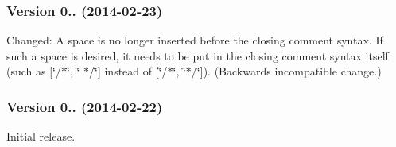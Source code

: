 \subsubsection*{Version 0.. (2014-\/02-\/23)}


\begin{DoxyItemize}
\item Changed\+: A space is no longer inserted before the closing comment syntax. If such a space is desired, it needs to be put in the closing comment syntax itself (such as {\ttfamily \mbox{[}\char`\"{}/$\ast$\char`\"{}, \char`\"{} $\ast$/\char`\"{}\mbox{]}} instead of {\ttfamily \mbox{[}\char`\"{}/$\ast$\char`\"{}, \char`\"{}$\ast$/\char`\"{}\mbox{]}}). (Backwards incompatible change.)
\end{DoxyItemize}

\subsubsection*{Version 0.. (2014-\/02-\/22)}


\begin{DoxyItemize}
\item Initial release. 
\end{DoxyItemize}